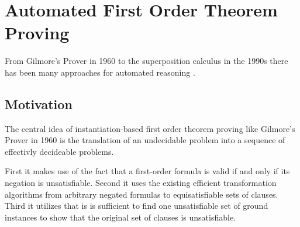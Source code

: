 
\chapter{Automated First Order Theorem Proving}



From Gilmore's Prover \cite{5392528} in 1960 
to the superposition calculus  in the 1990s there has been many approaches for automated reasoning \cite{Robinson:2001:HAR:778522}. 

\section{Motivation}

The central idea of instantiation-based first order theorem proving like Gilmore's Prover \cite{5392528} in 1960 is the
translation of an undecidable problem into a sequence of effectivly decideable problems.

First it makes use of the fact that a first-order formula is valid if and only if its negation is unsatisfiable.
Second it uses the existing efficient transformation algorithms from arbitrary negated formulas to equisatisfiable sets of clauses.
Third it utilizes that is is sufficient to find one unsatisfiable set of ground instances 
to show that the original set of clauses is unsatisfiable.


